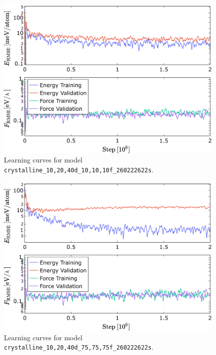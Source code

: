 \begin{figure}
  \begin{center}
    \includegraphics[width=.8\textwidth]{
      asset/crystalline_10,20,40d_10,10,10f_260222622s_energy_force_l_curve.jpg
    }
  \end{center}
  \caption{Learning curves for model \texttt{crystalline\_10,20,40d\_10,10,10f\_260222622s}.}
  \label{fig:crystalline_10,20,40d_10,10,10f_260222622s-learning-curves}
\end{figure}

\begin{figure}
  \begin{center}
    \includegraphics[width=.8\textwidth]{
      asset/crystalline_10,20,40d_75,75,75f_260222622s_energy_force_l_curve.jpg
    }
  \end{center}
  \caption{Learning curves for model \texttt{crystalline\_10,20,40d\_75,75,75f\_260222622s}.}
  \label{fig:crystalline_10,20,40d_75,75,75f_260222622s-learning-curves}
\end{figure}

